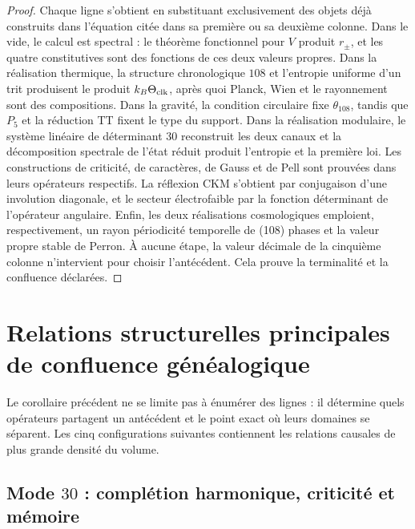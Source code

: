 \begin{proof}
Chaque ligne s'obtient en substituant exclusivement des objets déjà construits dans
l'équation citée dans sa première ou sa deuxième colonne. Dans le vide, le calcul
est spectral : le théorème fonctionnel pour \(V\) produit \(r_\pm\), et les quatre
constitutives sont des fonctions de ces deux valeurs propres. Dans la réalisation
thermique, la structure chronologique \(108\) et l'entropie uniforme d'un
trit produisent le produit
\(k_B\Theta_{\rm clk}\), après quoi Planck, Wien et le rayonnement sont des
compositions. Dans la gravité, la condition circulaire fixe
\(\theta_{108}\), tandis que \(P_5\) et la réduction TT fixent le type du
support. Dans la réalisation modulaire, le système linéaire de déterminant \(30\)
reconstruit les deux canaux et la décomposition spectrale de l'état réduit
produit l'entropie et la première loi. Les constructions de criticité,
de caractères, de Gauss et de
Pell sont prouvées dans leurs opérateurs respectifs. La réflexion CKM s'obtient
par conjugaison d'une involution diagonale, et le secteur électrofaible par
la fonction déterminant de l'opérateur angulaire. Enfin, les deux
réalisations cosmologiques emploient, respectivement, un rayon périodicité temporelle de (108) phases et la
valeur propre stable
de Perron. À aucune étape, la valeur décimale de la cinquième colonne n'intervient pour
choisir l'antécédent. Cela prouve la terminalité et la confluence déclarées.
\end{proof}

\section{Relations structurelles principales de confluence généalogique}

Le corollaire précédent ne se limite pas à énumérer des lignes : il détermine quels
opérateurs partagent un antécédent et le point exact où leurs domaines se
séparent. Les cinq configurations suivantes contiennent les relations
causales de plus grande densité du volume.

\subsection{Mode \(30\) : complétion harmonique, criticité et mémoire}

